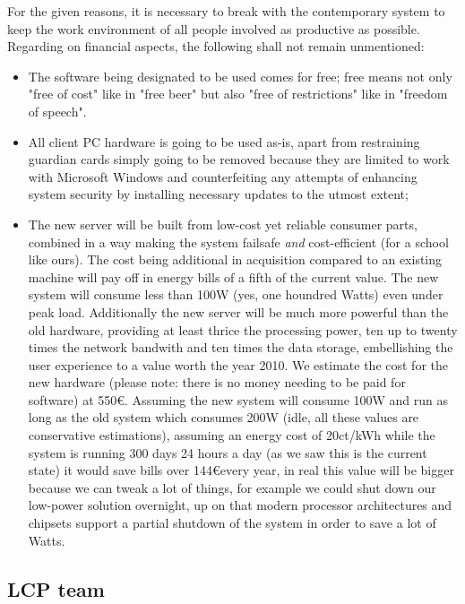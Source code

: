For the given reasons, it is necessary to break with the contemporary system to keep the work environment of all people involved as productive as possible. Regarding on financial aspects, the following shall not remain unmentioned:
\begin{itemize}
 \item The software being designated to be used comes for free; free means not only "free of cost" like in "free beer" but also "free of restrictions" like in "freedom of speech".
 \item All client PC hardware is going to be used as-is, apart from restraining guardian cards simply going to be removed because they are limited to work with Microsoft Windows and counterfeiting any attempts of enhancing system security by installing necessary updates to the utmost extent;
 \item The new server will be built from low-cost yet reliable consumer parts, combined in a way making the system failsafe \emph{and} cost-efficient (for a school like ours). The cost being additional in acquisition compared to an existing machine will pay off in energy bills of a fifth of the current value. The new system will consume less than 100W (yes, one houndred Watts) even under peak load. Additionally the new server will be much more powerful than the old hardware, providing at least thrice the processing power, ten up to twenty times the network bandwith and ten times the data storage, embellishing the user experience to a value worth the year 2010. We estimate the cost for the new hardware (please note: there is no money needing to be paid for software) at 550\euro. Assuming the new system will consume 100W and run as long as the old system which consumes 200W (idle, all these values are conservative estimations), assuming an energy cost of 20ct/kWh while the system is running 300 days 24 hours a day (as we saw this is the current state) it would save bills over 144\euro every year, in real this value will be bigger because we can tweak a lot of things, for example we could shut down our low-power solution overnight, up on that modern processor architectures and chipsets support a partial shutdown of the system in order to save a lot of Watts.
\end{itemize}

 
\subsection{LCP team}

